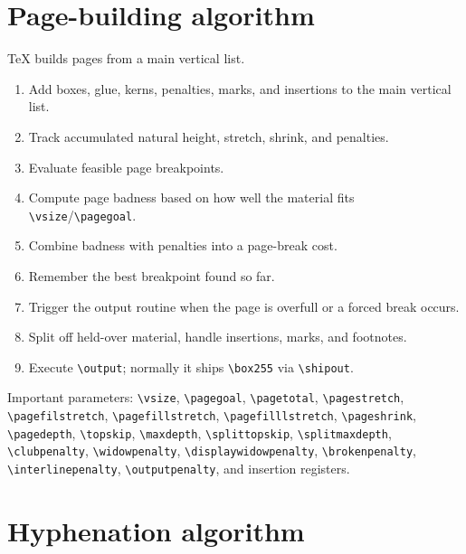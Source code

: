 \documentclass[11pt]{article}
\newcommand{\tightlist}{}
\begin{document}
\section{Page-building algorithm}\label{page-building-algorithm}

TeX builds pages from a main vertical list.

\begin{enumerate}
\def\labelenumi{\arabic{enumi}.}
\tightlist
\item
  Add boxes, glue, kerns, penalties, marks, and insertions to the main vertical list.
\item
  Track accumulated natural height, stretch, shrink, and penalties.
\item
  Evaluate feasible page breakpoints.
\item
  Compute page badness based on how well the material fits \texttt{\textbackslash{}vsize}/\texttt{\textbackslash{}pagegoal}.
\item
  Combine badness with penalties into a page-break cost.
\item
  Remember the best breakpoint found so far.
\item
  Trigger the output routine when the page is overfull or a forced break occurs.
\item
  Split off held-over material, handle insertions, marks, and footnotes.
\item
  Execute \texttt{\textbackslash{}output}; normally it ships \texttt{\textbackslash{}box255} via \texttt{\textbackslash{}shipout}.
\end{enumerate}

{\raggedright Important parameters: \texttt{\textbackslash{}vsize}, \texttt{\textbackslash{}pagegoal}, \texttt{\textbackslash{}pagetotal}, \texttt{\textbackslash{}pagestretch}, \texttt{\textbackslash{}pagefilstretch}, \texttt{\textbackslash{}pagefillstretch}, \texttt{\textbackslash{}pagefilllstretch}, \texttt{\textbackslash{}pageshrink}, \texttt{\textbackslash{}pagedepth}, \texttt{\textbackslash{}topskip}, \texttt{\textbackslash{}maxdepth}, \texttt{\textbackslash{}splittopskip}, \texttt{\textbackslash{}splitmaxdepth}, \texttt{\textbackslash{}clubpenalty}, \texttt{\textbackslash{}widowpenalty}, \texttt{\textbackslash{}displaywidowpenalty}, \texttt{\textbackslash{}brokenpenalty}, \texttt{\textbackslash{}interlinepenalty}, \texttt{\textbackslash{}outputpenalty}, and insertion registers.\par}

\section{Hyphenation algorithm}\label{hyphenation-algorithm}
\end{document}
